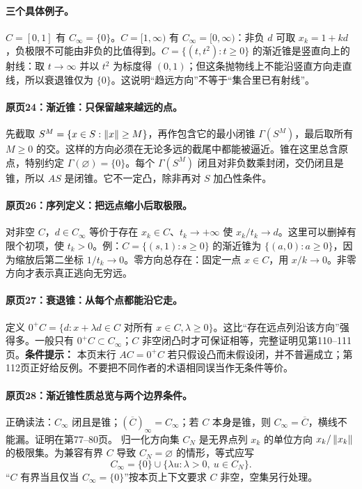 \paragraph{三个具体例子。}
$C=[0,1]$ 有 $C_\infty=\{0\}$。$C=[1,\infty)$ 有 $C_\infty=[0,\infty)$：非负 $d$ 可取 $x_k=1+kd$，负极限不可能由非负的比值得到。$C=\{(t,t^2):t\ge0\}$ 的渐近锥是竖直向上的射线：取 $t\to\infty$ 并以 $t^2$ 为标度得 $(0,1)$；但这条抛物线上不能沿竖直方向走直线，所以衰退锥仅为 $\{0\}$。这说明“趋远方向”不等于“集合里已有射线”。


\paragraph{原页24：渐近锥：只保留越来越远的点。}先截取 $S^M=\{x\in S:\left\lVert x\right\rVert\ge M\}$，再作包含它的最小闭锥 $\Gamma(S^M)$，最后取所有 $M\ge0$ 的交。这样的方向必须在无论多远的截尾中都能被逼近。锥在这里总含原点，特别约定 $\Gamma(\varnothing)=\{0\}$。每个 $\Gamma(S^M)$ 闭且对非负数乘封闭，交仍闭且是锥，所以 $AS$ 是闭锥。它不一定凸，除非再对 $S$ 加凸性条件。



\paragraph{原页26：序列定义：把远点缩小后取极限。}对非空 $C$，$d\in C_\infty$ 等价于存在 $x_k\in C$、$t_k\to+\infty$ 使 $x_k/t_k\to d$。这里可以删掉有限个初项，使 $t_k>0$。例：$C=\{(s,1):s\ge0\}$ 的渐近锥为 $\{(a,0):a\ge0\}$，因为缩放后第二坐标 $1/t_k\to0$。零方向总存在：固定一点 $x\in C$，用 $x/k\to0$。非零方向才表示真正逃向无穷远。



\paragraph{原页27：衰退锥：从每个点都能沿它走。}定义 $0^+C=\{d:x+\lambda d\in C\text{ 对所有 }x\in C,\lambda\ge0\}$。这比“存在远点列沿该方向”强得多。一般只有 $0^+C\subset C_\infty$；$C$ 非空闭凸时才可保证相等，完整证明见第110--111页。\textbf{条件提示：} 本页末行 $AC=0^+C$ 若只假设凸而未假设闭，并不普遍成立；第112页正好给反例。不要把不同作者的术语相同误当作无条件等价。



\paragraph{原页28：渐近锥性质总览与两个边界条件。}正确读法：$C_\infty$ 闭且是锥；$(\overline C)_\infty=C_\infty$；若 $C$ 本身是锥，则 $C_\infty=\overline C$，横线不能漏。证明在第77--80页。
归一化方向集 $C_N$ 是无界点列 $x_k$ 的单位方向 $x_k/\left\lVert x_k\right\rVert$ 的极限集。为兼容有界 $C$ 导致 $C_N=\varnothing$ 的情形，等式应写
\[C_\infty=\{0\}\cup\{\lambda u:\lambda>0,\ u\in C_N\}.\]
“$C$ 有界当且仅当 $C_\infty=\{0\}$”按本页上下文要求 $C$ 非空，空集另行处理。



